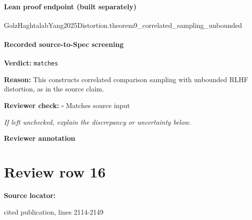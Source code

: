 \documentclass[10pt]{article}
\newcommand{\reviewerbox}{%
  \par\noindent\fbox{\parbox{0.96\linewidth}{\rule{0pt}{0.38in}}}\par
}
\newcommand{\reviewmatch}[1]{%
  \par\noindent\textbf{Reviewer check:} $\square$\; #1\par
  \noindent\emph{If left unchecked, explain the discrepancy or uncertainty below.}\par
}
\begin{document}
\paragraph{Lean proof endpoint (built separately)}\begin{ReviewVerbatim}
GolzHaghtalabYang2025Distortion.theorem9_correlated_sampling_unbounded
\end{ReviewVerbatim}

\paragraph{Recorded source-to-Spec screening}
\textbf{Verdict:} \texttt{matches}
\\
{\raggedright
\textbf{Reason:} This constructs correlated comparison sampling with unbounded RLHF distortion, as in the source claim.\allowbreak{}
\par}
\reviewmatch{Matches source input}
\noindent\textbf{Reviewer annotation}\par
\reviewerbox
\clearpage
\hypertarget{source-claim-cc5e88fff44863d2}{}
\section*{Review row 16}
\textbf{Source locator:} {\footnotesize\raggedright cited publication, lines 2114-\allowbreak{}2149\par}
\end{document}
